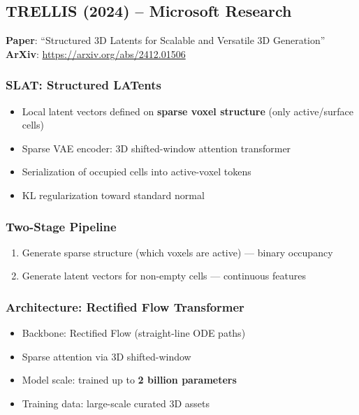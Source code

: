 \documentclass[11pt, a4paper]{article}
\begin{document}
\subsection{TRELLIS (2024) -- Microsoft Research}

\textbf{Paper}: ``Structured 3D Latents for Scalable and Versatile 3D Generation''\\
\textbf{ArXiv}: \url{https://arxiv.org/abs/2412.01506}

\subsubsection{SLAT: Structured LATents}

\begin{itemize}
    \item Local latent vectors defined on \textbf{sparse voxel structure} (only active/surface cells)
    \item Sparse VAE encoder: 3D shifted-window attention transformer
    \item Serialization of occupied cells into active-voxel tokens
    \item KL regularization toward standard normal
\end{itemize}

\subsubsection{Two-Stage Pipeline}

\begin{enumerate}
    \item Generate sparse structure (which voxels are active) --- binary occupancy
    \item Generate latent vectors for non-empty cells --- continuous features
\end{enumerate}

\subsubsection{Architecture: Rectified Flow Transformer}

\begin{itemize}
    \item Backbone: Rectified Flow (straight-line ODE paths)
    \item Sparse attention via 3D shifted-window
    \item Model scale: trained up to \textbf{2 billion parameters}
    \item Training data: large-scale curated 3D assets
\end{itemize}
\end{document}
